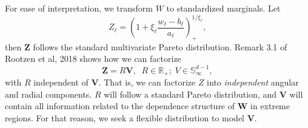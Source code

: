 \documentclass[20pt, a0paper, landscape, colspace=9mm, subcolspace=4mm, blockverticalspace=9mm, innermargin=8mm, margin=0mm]{tikzposter}
\begin{document}
\begin{columns}
{        For ease of interpretation, we transform $W$ to standardized marginals. Let 
        \[Z_{\ell} = \left(1 + \xi_{\ell}\frac{w_{\ell} - b_{\ell}}{a_{\ell}}\right)_+^{1/\xi_{\ell}},\]
        then $\bm{Z}$ follows the standard multivariate Pareto distribution.
        Remark 3.1 of Rootzen et al, 2018 shows how %
        we can factorize \[\bm{Z} =
            R\bm{V},\;\;R\in\mathbb{R}_+;\;V\in\mathbb{S}_{\infty}^{d-1},\]
        with $R$ independent of $\bm{V}$. 
        That is, we can factorize $Z$ into
        \emph{independent} angular and radial components. $R$ will follow
        a standard Pareto distribution, and $\bm{V}$ will contain all 
        information related to the dependence structure of $\bm{W}$ in extreme
        regions.  For that reason, we seek a flexible distribution to model
        $\bm{V}$.
        }
\end{columns}
\end{document}

